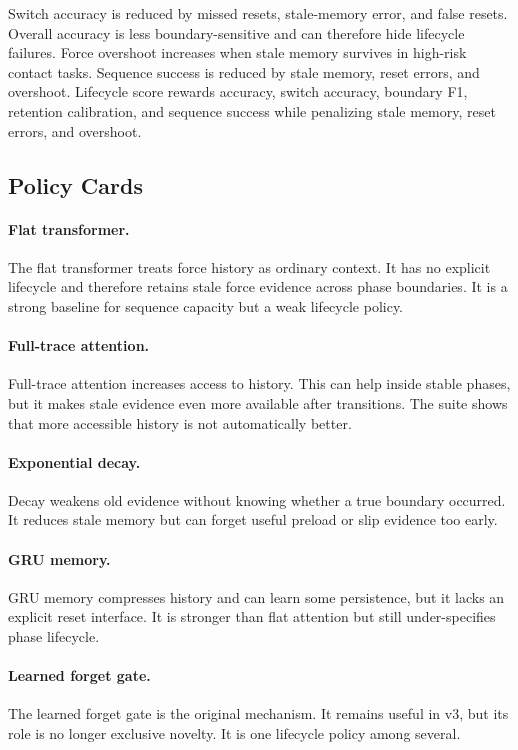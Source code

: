\documentclass{article}
\begin{document}
Switch accuracy is reduced by missed resets, stale-memory error, and false
resets. Overall accuracy is less boundary-sensitive and can therefore hide
lifecycle failures. Force overshoot increases when stale memory survives in
high-risk contact tasks. Sequence success is reduced by stale memory, reset
errors, and overshoot. Lifecycle score rewards accuracy, switch accuracy,
boundary F1, retention calibration, and sequence success while penalizing stale
memory, reset errors, and overshoot.

\subsection{Policy Cards}

\paragraph{Flat transformer.}
The flat transformer treats force history as ordinary context. It has no
explicit lifecycle and therefore retains stale force evidence across phase
boundaries. It is a strong baseline for sequence capacity but a weak lifecycle
policy.

\paragraph{Full-trace attention.}
Full-trace attention increases access to history. This can help inside stable
phases, but it makes stale evidence even more available after transitions. The
suite shows that more accessible history is not automatically better.

\paragraph{Exponential decay.}
Decay weakens old evidence without knowing whether a true boundary occurred. It
reduces stale memory but can forget useful preload or slip evidence too early.

\paragraph{GRU memory.}
GRU memory compresses history and can learn some persistence, but it lacks an
explicit reset interface. It is stronger than flat attention but still
under-specifies phase lifecycle.

\paragraph{Learned forget gate.}
The learned forget gate is the original mechanism. It remains useful in v3, but
its role is no longer exclusive novelty. It is one lifecycle policy among
several.
\end{document}
